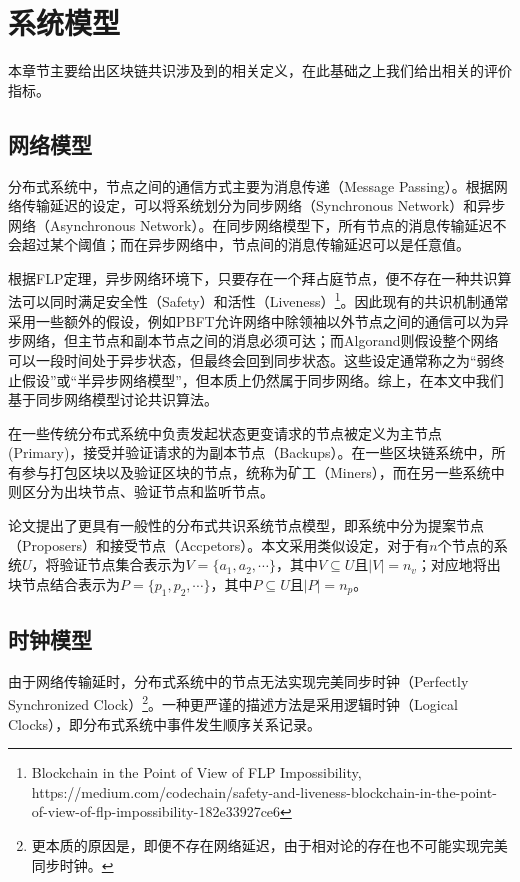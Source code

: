 \section{系统模型}
本章节主要给出区块链共识涉及到的相关定义，在此基础之上我们给出相关的评价指标。

\subsection{网络模型}
分布式系统中，节点之间的通信方式主要为消息传递（Message Passing）。根据网络传输延迟的设定，可以将系统划分为同步网络（Synchronous Network）和异步网络（Asynchronous Network）。在同步网络模型下，所有节点的消息传输延迟不会超过某个阈值；而在异步网络中，节点间的消息传输延迟可以是任意值。

根据FLP定理\cite{fischer1982impossibility}，异步网络环境下，只要存在一个拜占庭节点，便不存在一种共识算法可以同时满足安全性（Safety）和活性（Liveness）\footnote{Blockchain in the Point of View of FLP Impossibility, https://medium.com/codechain/safety-and-liveness-blockchain-in-the-point-of-view-of-flp-impossibility-182e33927ce6}。因此现有的共识机制通常采用一些额外的假设，例如PBFT允许网络中除领袖以外节点之间的通信可以为异步网络，但主节点和副本节点之间的消息必须可达\cite{castro1999practical}；而Algorand则假设整个网络可以一段时间处于异步状态，但最终会回到同步状态\cite{gilad2017algorand}。这些设定通常称之为“弱终止假设”或“半异步网络模型”，但本质上仍然属于同步网络。综上，在本文中我们基于同步网络模型讨论共识算法。


在一些传统分布式系统中负责发起状态更变请求的节点被定义为主节点(Primary)，接受并验证请求的为副本节点（Backups）\cite{lamport2001paxos,castro1999practical}。在一些区块链系统中，所有参与打包区块以及验证区块的节点，统称为矿工（Miners），而在另一些系统中则区分为出块节点、验证节点和监听节点\cite{ultrain2019}。

论文\cite{howard2019consensus}提出了更具有一般性的分布式共识系统节点模型，即系统中分为提案节点（Proposers）和接受节点（Accpetors）。本文采用类似设定，对于有$n$个节点的系统$U$，将验证节点集合表示为$V=\{a_1,a_2,\cdots\}$，其中$V\subseteq U$且$|V|=n_v$；对应地将出块节点结合表示为$P=\{p_1,p_2,\cdots\}$，其中$P\subseteq U$且$|P|=n_p$。


\subsection{时钟模型}
由于网络传输延时，分布式系统中的节点无法实现完美同步时钟（Perfectly Synchronized Clock）\footnote{更本质的原因是，即便不存在网络延迟，由于相对论的存在也不可能实现完美同步时钟。}。一种更严谨的描述方法是采用逻辑时钟（Logical Clocks）\cite{lamport1978time}，即分布式系统中事件发生顺序关系记录。

